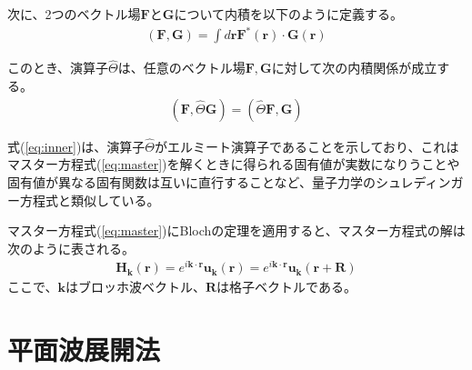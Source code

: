 \documentclass[platex,dvipdfmx]{jsreport}
\numberwithin{equation}{section}
\begin{document}
次に、2つのベクトル場$\bm{F}$と$\bm{G}$について内積を以下のように定義する。
\begin{align}
  (\bm{F}, \bm{G}) = \int d\bm{r} \bm{F}^*(\bm{r}) \cdot \bm{G}(\bm{r})
\end{align}

このとき、演算子$\hat{\Theta}$は、任意のベクトル場$\bm{F}, \bm{G}$に対して次の内積関係が成立する。
\begin{align}
  \label{eq:inner}
  (\bm{F}, \hat{\Theta} \bm{G}) = (\hat{\Theta} \bm{F}, \bm{G})
\end{align}

式(\ref{eq:inner})は、演算子$\hat{\Theta}$がエルミート演算子であることを示しており、これはマスター方程式(\ref{eq:master})を解くときに得られる固有値が実数になりうことや固有値が異なる固有関数は互いに直行することなど、量子力学のシュレディンガー方程式と類似している。

マスター方程式(\ref{eq:master})にBlochの定理を適用すると、マスター方程式の解は次のように表される。
\begin{align}
  \bm{H}_{\bm{k}}(\bm{r}) = e^{i \bm{k} \cdot \bm{r}} \bm{u}_{\bm{k}}(\bm{r}) = e^{i \bm{k} \cdot \bm{r}} \bm{u}_{\bm{k}}(\bm{r + R})
\end{align}
ここで、$\bm{k}$はブロッホ波ベクトル、$\bm{R}$は格子ベクトルである。

\section{平面波展開法}
\end{document}
